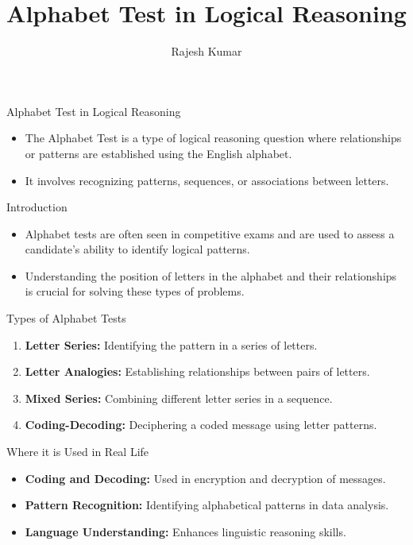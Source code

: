 \title{Alphabet Test in Logical Reasoning}
\author{Rajesh Kumar}
\date{}

\begin{frame}
  \titlepage
\end{frame}

\begin{frame}{Alphabet Test in Logical Reasoning}
  \begin{itemize}
    \item The Alphabet Test is a type of logical reasoning question where relationships or patterns are established using the English alphabet.
    \item It involves recognizing patterns, sequences, or associations between letters.
  \end{itemize}
\end{frame}

\begin{frame}{Introduction}
  \begin{itemize}
    \item Alphabet tests are often seen in competitive exams and are used to assess a candidate's ability to identify logical patterns.
    \item Understanding the position of letters in the alphabet and their relationships is crucial for solving these types of problems.
  \end{itemize}
\end{frame}

\begin{frame}{Types of Alphabet Tests}
  \begin{enumerate}
    \item \textbf{Letter Series:} Identifying the pattern in a series of letters.
    \item \textbf{Letter Analogies:} Establishing relationships between pairs of letters.
    \item \textbf{Mixed Series:} Combining different letter series in a sequence.
    \item \textbf{Coding-Decoding:} Deciphering a coded message using letter patterns.
  \end{enumerate}
\end{frame}

\begin{frame}{Where it is Used in Real Life}
  \begin{itemize}
    \item \textbf{Coding and Decoding:} Used in encryption and decryption of messages.
    \item \textbf{Pattern Recognition:} Identifying alphabetical patterns in data analysis.
    \item \textbf{Language Understanding:} Enhances linguistic reasoning skills.
  \end{itemize}
\end{frame}

